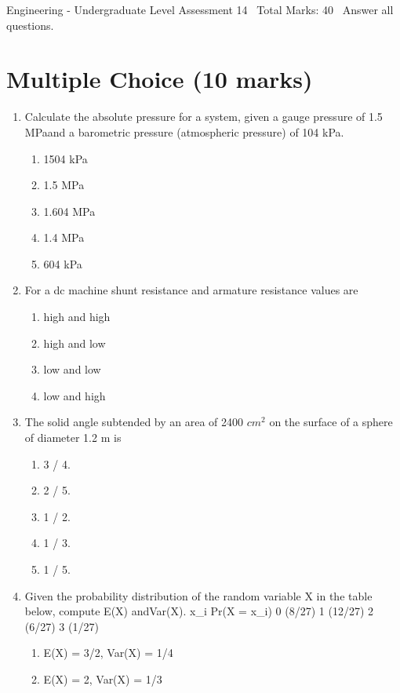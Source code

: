 \documentclass[12pt]{article}
\begin{document}
\begin{center}
Engineering - Undergraduate Level Assessment 14 \
Total Marks: 40 \
Answer all questions.
\end{center}

\section*{Multiple Choice (10 marks)}
\begin{enumerate}[label=\arabic*.]
\item Calculate the absolute pressure for a system, given a gauge pressure of 1.5 MPaand a barometric pressure (atmospheric pressure) of 104 kPa.
\begin{enumerate}[label=(\alph*)]
    \item 1504 kPa
    \item 1.5 MPa
    \item 1.604 MPa
    \item 1.4 MPa
    \item 604 kPa
\end{enumerate}
\item For a dc machine shunt resistance and armature resistance values are
\begin{enumerate}[label=(\alph*)]
    \item high and high
    \item high and low
    \item low and low
    \item low and high
\end{enumerate}
\item The solid angle subtended by an area of 2400 $cm^2$ on the surface of a sphere of diameter 1.2 m is
\begin{enumerate}[label=(\alph*)]
    \item 3 / 4.
    \item 2 / 5.
    \item 1 / 2.
    \item 1 / 3.
    \item 1 / 5.
\end{enumerate}
\item Given the probability distribution of the random variable X in the table below, compute E(X) andVar(X). x\_i Pr(X = x\_i) 0 (8/27) 1 (12/27) 2 (6/27) 3 (1/27)
\begin{enumerate}[label=(\alph*)]
    \item E(X) = 3/2, Var(X) = 1/4
    \item E(X) = 2, Var(X) = 1/3

\end{enumerate}
\end{enumerate}
\end{document}
